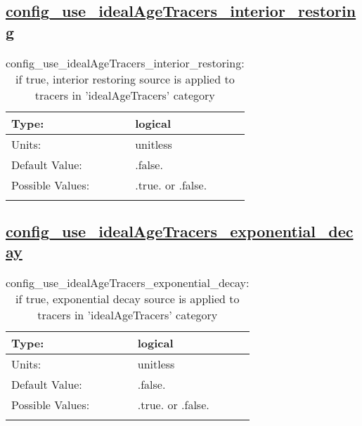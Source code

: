 \subsection[config\_use\_idealAgeTracers\_interior\_restoring]{\hyperref[sec:nm_tab_tracer_forcing_idealAgeTracers]{config\_use\_idealAgeTracers\_interior\_restoring}}
\label{subsec:nm_sec_config_use_idealAgeTracers_interior_restoring}
\begin{center}
\begin{longtable}{| p{2.0in} || p{4.0in} |}
    \hline
    Type: & logical \\
    \hline
    Units: & \si{unitless} \\
    \hline
    Default Value: & .false. \\
    \hline
    Possible Values: & .true. or .false. \\
    \hline
    \caption{config\_use\_idealAgeTracers\_interior\_restoring: if true, interior restoring source is applied to tracers in 'idealAgeTracers' category}
\end{longtable}
\end{center}
\subsection[config\_use\_idealAgeTracers\_exponential\_decay]{\hyperref[sec:nm_tab_tracer_forcing_idealAgeTracers]{config\_use\_idealAgeTracers\_exponential\_decay}}
\label{subsec:nm_sec_config_use_idealAgeTracers_exponential_decay}
\begin{center}
\begin{longtable}{| p{2.0in} || p{4.0in} |}
    \hline
    Type: & logical \\
    \hline
    Units: & \si{unitless} \\
    \hline
    Default Value: & .false. \\
    \hline
    Possible Values: & .true. or .false. \\
    \hline
    \caption{config\_use\_idealAgeTracers\_exponential\_decay: if true, exponential decay source is applied to tracers in 'idealAgeTracers' category}
\end{longtable}
\end{center}
